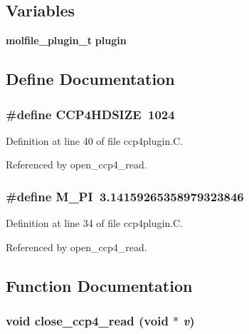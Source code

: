 \subsection*{Variables}
\begin{CompactItemize}
\item 
{\bf molfile\_\-plugin\_\-t} {\bf plugin}
\end{CompactItemize}


\subsection{Define Documentation}
\subsubsection{\setlength{\rightskip}{0pt plus 5cm}\#define CCP4HDSIZE\ 1024}\label{ccp4plugin_8C_a1}




Definition at line 40 of file ccp4plugin.C.

Referenced by open\_\-ccp4\_\-read.
\subsubsection{\setlength{\rightskip}{0pt plus 5cm}\#define M\_\-PI\ 3.14159265358979323846}\label{ccp4plugin_8C_a0}




Definition at line 34 of file ccp4plugin.C.

Referenced by open\_\-ccp4\_\-read.

\subsection{Function Documentation}
\subsubsection{\setlength{\rightskip}{0pt plus 5cm}void close\_\-ccp4\_\-read (void $\ast$ {\em v})\hspace{0.3cm}{\tt  [static]}}\label{ccp4plugin_8C_a6}




